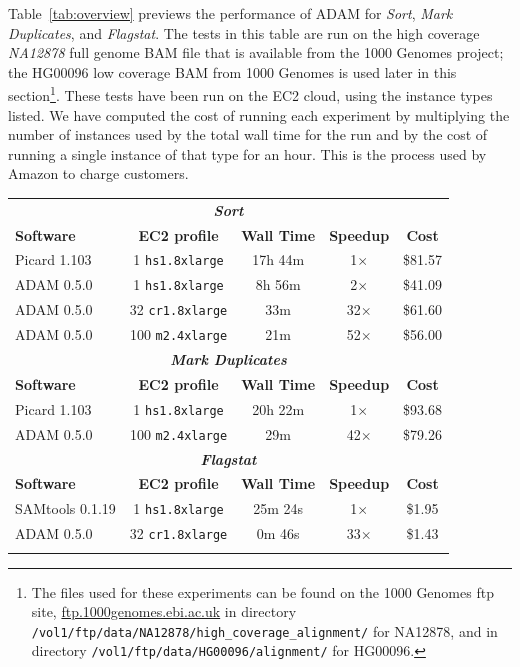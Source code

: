 \documentclass{bioinfo}
\begin{document}
Table~\ref{tab:overview} previews the performance of ADAM for \textit{Sort}, \textit{Mark Duplicates}, and \textit{Flagstat}. The tests in this table are run on
the high coverage \textit{NA12878} full genome BAM file that is available from the 1000 Genomes project; the HG00096 low coverage BAM from 1000 Genomes
is used later in this section\footnote{The files used for these experiments can be found on the 1000 Genomes ftp site, \url{ftp.1000genomes.ebi.ac.uk} in directory
\texttt{/vol1/ftp/data/NA12878/high\_coverage\_alignment/} for NA12878, and in directory \texttt{/vol1/ftp/data/HG00096/alignment/} for HG00096.}. These tests have been
run on the EC2 cloud, using the instance types listed. We have computed the cost of running each experiment by multiplying the number of instances used by the total
wall time for the run and by the cost of running a single instance of that type for an hour. This is the process used by Amazon to charge customers.

\begin{table}[h]
{\begin{tabular}{ l c c c c }
\toprule
\multicolumn{5}{c}{\bf \textit{Sort}} \\
\bf Software & \bf EC2 profile & \bf Wall Time & \bf Speedup & \bf Cost \\
\midrule
Picard 1.103 & 1 \texttt{hs1.8xlarge} & 17h 44m & 1$\times$ & \$81.57 \\
ADAM 0.5.0 & 1 \texttt{hs1.8xlarge} & 8h 56m & 2$\times$ & \$41.09 \\
ADAM 0.5.0 & 32 \texttt{cr1.8xlarge} & 33m & 32$\times$ & \$61.60 \\
ADAM 0.5.0 & 100 \texttt{m2.4xlarge} & 21m & 52$\times$ & \$56.00 \\ 
\midrule
\multicolumn{5}{c}{\bf \textit{Mark Duplicates}} \\
\bf Software & \bf EC2 profile & \bf Wall Time & \bf Speedup & \bf Cost  \\
\midrule
Picard 1.103 & 1 \texttt{hs1.8xlarge} & 20h 22m & 1$\times$ & \$93.68 \\
ADAM 0.5.0 & 100 \texttt{m2.4xlarge} & 29m & 42$\times$ & \$79.26 \\
\midrule
\multicolumn{5}{c}{\bf \textit{Flagstat}} \\
\bf Software & \bf EC2 profile & \bf Wall Time & \bf Speedup & \bf Cost  \\
\midrule
SAMtools 0.1.19 & 1 \texttt{hs1.8xlarge} & 25m 24s & 1$\times$ & \$1.95 \\
ADAM 0.5.0 & 32 \texttt{cr1.8xlarge} & 0m 46s & 33$\times$ & \$1.43 \\
\botrule
\end{tabular}}{}
\end{table}
\end{document}

